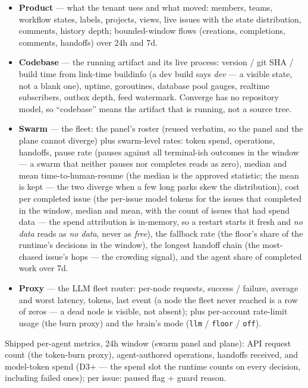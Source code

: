 \documentclass[11pt,a4paper]{report}
\begin{document}
\begin{itemize}
\item \textbf{Product} --- what the tenant uses and what moved:
  members, teams, workflow states, labels, projects, views, live issues
  with the state distribution, comments, history depth; bounded-window
  flows (creations, completions, comments, handoffs) over 24h and 7d.
\item \textbf{Codebase} --- the running artifact and its live process:
  version / git SHA / build time from link-time buildinfo (a dev build
  says \emph{dev} --- a visible state, not a blank one), uptime,
  goroutines, database pool gauges, realtime subscribers, outbox depth,
  feed watermark. Converge has no repository model, so
  ``codebase'' means the artifact that is running, not a source tree.
\item \textbf{Swarm} --- the fleet: the panel's roster (reused verbatim,
  so the panel and the plane cannot diverge) plus swarm-level rates:
  token spend, operations, handoffs, pause rate (pauses against all
  terminal-ish outcomes in the window --- a swarm that neither pauses
  nor completes reads as zero), median and mean time-to-human-resume
  (the median is the approved statistic; the mean is kept --- the two
  diverge when a few long parks skew the distribution), cost per
  completed issue (the per-issue model tokens for the issues that
  completed in the window, median and mean, with the count of issues
  that had spend data --- the spend attribution is in-memory, so a
  restart starts it fresh and \emph{no data} reads as \emph{no data},
  never as \emph{free}), the fallback rate (the floor's share of the
  runtime's decisions in the window), the longest handoff chain
  (the most-chased issue's hops --- the crowding signal), and the
  agent share of completed work over 7d.
\item \textbf{Proxy} --- the LLM fleet router: per-node requests,
  success / failure, average and worst latency, tokens, last event (a
  node the fleet never reached is a row of zeros --- a dead node is
  visible, not absent); plus per-account rate-limit usage (the burn
  proxy) and the brain's mode (\texttt{llm} / \texttt{floor} /
  \texttt{off}).
\end{itemize}

Shipped per-agent metrics, 24h window (swarm panel and plane): API
request count (the token-burn proxy), agent-authored operations,
handoffs received, and model-token spend (D3+ --- the spend slot the
runtime counts on every decision, including failed ones); per issue:
paused flag + guard reason.
\end{document}
